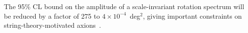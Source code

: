 \documentclass[PICOReport.tex]{subfiles}
\begin{document}
The 95\% CL bound on the amplitude of a scale-invariant rotation spectrum will be reduced by a factor of 275 to $4\times10^{-4}$~deg$^2$, giving important constraints on string-theory-motivated axions~\cite{Svrcek:2006yi,Pospelov:2008gg}.


\end{document}
